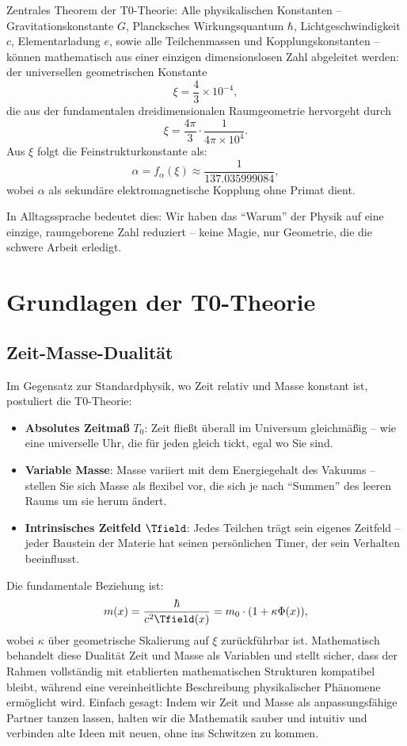 	\begin{keyresult}
		Zentrales Theorem der T0-Theorie: Alle physikalischen Konstanten – Gravitationskonstante $G$, Plancksches Wirkungsquantum $\hbar$, Lichtgeschwindigkeit $c$, Elementarladung $e$, sowie alle Teilchenmassen und Kopplungskonstanten – können mathematisch aus einer einzigen dimensionslosen Zahl abgeleitet werden: der universellen geometrischen Konstante
		\[
		\xi = \frac{4}{3} \times 10^{-4},
		\]
		die aus der fundamentalen dreidimensionalen Raumgeometrie hervorgeht durch
		\[
		\xi = \frac{4\pi}{3} \cdot \frac{1}{4\pi \times 10^4}.
		\]
		Aus $\xi$ folgt die Feinstrukturkonstante als:
		\[
		\alpha = f_\alpha(\xi) \approx \frac{1}{137.035999084},
		\]
		wobei $\alpha$ als sekundäre elektromagnetische Kopplung ohne Primat dient.
	\end{keyresult}
	
	In Alltagssprache bedeutet dies: Wir haben das ``Warum'' der Physik auf eine einzige, raumgeborene Zahl reduziert – keine Magie, nur Geometrie, die die schwere Arbeit erledigt.
	
	\section{Grundlagen der T0-Theorie}
	\subsection{Zeit-Masse-Dualität}
	Im Gegensatz zur Standardphysik, wo Zeit relativ und Masse konstant ist, postuliert die T0-Theorie:
	\begin{itemize}
		\item \textbf{Absolutes Zeitmaß} $T_0$: Zeit fließt überall im Universum gleichmäßig – wie eine universelle Uhr, die für jeden gleich tickt, egal wo Sie sind.
		\item \textbf{Variable Masse}: Masse variiert mit dem Energiegehalt des Vakuums – stellen Sie sich Masse als flexibel vor, die sich je nach ``Summen'' des leeren Raums um sie herum ändert.
		\item \textbf{Intrinsisches Zeitfeld} $\Tfield$: Jedes Teilchen trägt sein eigenes Zeitfeld – jeder Baustein der Materie hat seinen persönlichen Timer, der sein Verhalten beeinflusst.
	\end{itemize}
	
	Die fundamentale Beziehung ist:
	\[
	m(x) = \frac{\hbar}{c^2 \Tfield(x)} = m_0 \cdot (1 + \kappa \Phi(x)),
	\]
	wobei $\kappa$ über geometrische Skalierung auf $\xi$ zurückführbar ist. Mathematisch behandelt diese Dualität Zeit und Masse als Variablen und stellt sicher, dass der Rahmen vollständig mit etablierten mathematischen Strukturen kompatibel bleibt, während eine vereinheitlichte Beschreibung physikalischer Phänomene ermöglicht wird. Einfach gesagt: Indem wir Zeit und Masse als anpassungsfähige Partner tanzen lassen, halten wir die Mathematik sauber und intuitiv und verbinden alte Ideen mit neuen, ohne ins Schwitzen zu kommen.
	
